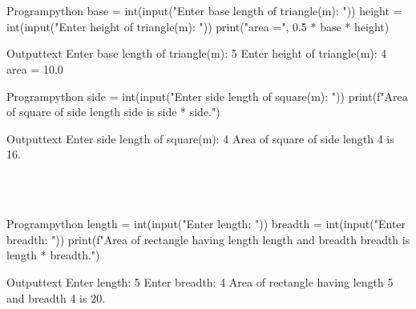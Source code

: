 \documentclass[11pt]{ipu-python}
\begin{document}
    \\~\\
    \begin{code}
        {Program}{python}
base = int(input("Enter base length of triangle(m): "))
height = int(input("Enter height of triangle(m): "))
print("area =", 0.5 * base * height)
    \end{code}
    \begin{code}
        {Output}{text}
Enter base length of triangle(m): 5
Enter height of triangle(m): 4
area = 10.0
    \end{code}
    \newpage

    \begin{code}
        {Program}{python}
side = int(input("Enter side length of square(m): "))
print(f"Area of square of side length {side} is {side * side}.")
    \end{code}
    \begin{code}
        {Output}{text}
Enter side length of square(m): 4
Area of square of side length 4 is 16.
    \end{code}

    \\~\\
    \begin{code}
        {Program}{python}
length = int(input("Enter length: "))
breadth = int(input("Enter breadth: "))
print(f"Area of rectangle having length {length} and breadth {breadth} is {length * breadth}.")
    \end{code}
    \begin{code}
        {Output}{text}
Enter length: 5
Enter breadth: 4
Area of rectangle having length 5 and breadth 4 is 20.
    \end{code}

\end{document}
